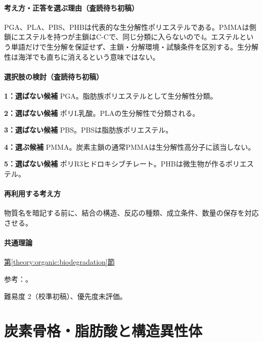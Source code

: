 \paragraph{考え方・正答を選ぶ理由（査読待ち初稿）} PGA、PLA、PBS、PHBは代表的な生分解性ポリエステルである。PMMAは側鎖にエステルを持つが主鎖はC-Cで、同じ分類に入らないので4。エステルという単語だけで生分解を保証せず、主鎖・分解環境・試験条件を区別する。生分解性は海洋でも直ちに消えるという意味ではない。

\paragraph{選択肢の検討（査読待ち初稿）}\mbox{}\par

\noindent\textbf{1：選ばない候補} PGA。脂肪族ポリエステルとして生分解性分類。\par

\noindent\textbf{2：選ばない候補} ポリL乳酸。PLAの生分解性で分類される。\par

\noindent\textbf{3：選ばない候補} PBS。PBSは脂肪族ポリエステル。\par

\noindent\textbf{4：選ぶ候補} PMMA。炭素主鎖の通常PMMAは生分解性高分子に該当しない。\par

\noindent\textbf{5：選ばない候補} ポリR3ヒドロキシブチレート。PHBは微生物が作るポリエステル。\par

\paragraph{再利用する考え方} 物質名を暗記する前に、結合の構造、反応の種類、成立条件、数量の保存を対応させる。

\paragraph{共通理論} \hyperref[theory:organic:biodegradation]{第\ref*{theory:organic:biodegradation}節}

\par 参考：\cite{organic_jbpa,organic_jbpa_en}。

\par 難易度 2（校準初稿）、優先度未評価。

\section{炭素骨格・脂肪酸と構造異性体}

